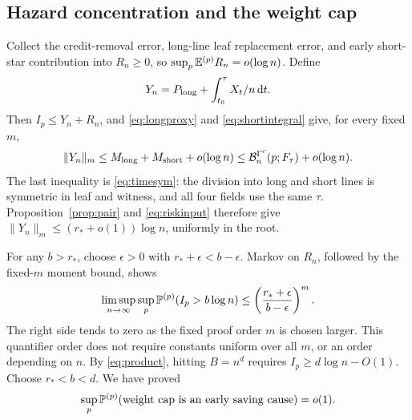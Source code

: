 \subsection{Hazard concentration and the weight cap}
Collect the credit-removal error, long-line leaf replacement error,
and early short-star contribution into \(R_n\ge0\), so
\(\sup_p\mathbb E^{(p)}R_n=o(\log n)\). Define
\[
 Y_n=P_{\rm long}+\int_{t_0}^\tau X_t/n\,\mathrm d t.
\]
Then \(I_p\le Y_n+R_n\), and \eqref{eq:longproxy} and
\eqref{eq:shortintegral} give, for every fixed \(m\),
\[
 \|Y_n\|_m\le M_{\rm long}+M_{\rm short}+o(\log n)
 \le\mathcal B_n^{\Gamma^c}(p;F_\tau)+o(\log n).
\]
The last inequality is \eqref{eq:timesym}: the division into long
and short lines is symmetric in leaf and witness, and all four
fields use the same \(\tau\).
Proposition~\ref{prop:pair} and \eqref{eq:riskinput} therefore give
\(\|Y_n\|_m\le(r_*+o(1))\log n\), uniformly in the root.

For any \(b>r_*\), choose \(\epsilon>0\) with
\(r_*+\epsilon<b-\epsilon\). Markov on \(R_n\), followed by
the fixed-\(m\) moment bound, shows
\[
 \limsup_{n\to\infty}\sup_p\mathbb P^{(p)}(I_p>b\log n)
 \le\left(\frac{r_*+\epsilon}{b-\epsilon}\right)^m.
\]
The right side tends to zero as the fixed proof order \(m\) is
chosen larger. This quantifier order does not require constants
uniform over all \(m\), or an order depending on \(n\).
By \eqref{eq:product}, hitting \(B=n^d\) requires
\(I_p\ge d\log n-O(1)\). Choose \(r_*<b<d\). We have proved
\begin{equation}\label{eq:captail}
 \sup_p\mathbb P^{(p)}(\text{weight cap is an early saving cause})=o(1).
\end{equation}

